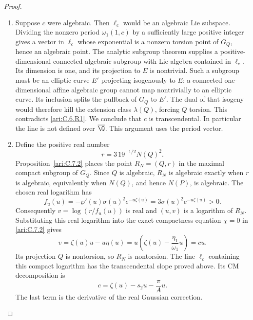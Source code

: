 \begin{proof}
\begin{enumerate}[label=\arabic*.,leftmargin=*]
\item Suppose $c$ were algebraic. Then $\ell_c$ would be an
algebraic Lie subspace. Dividing the nonzero period
$\omega_1(1,c)$ by a sufficiently large positive integer
gives a vector in $\ell_c$ whose exponential is a nonzero
torsion point of $G_Q$, hence an algebraic point. The
analytic subgroup theorem
\citep[Theorem~6.1, arXiv v8, p.~43]{huber2022} supplies a positive-dimensional
connected algebraic subgroup with Lie algebra contained in
$\ell_c$. Its dimension is one, and its projection to $E$
is nontrivial. Such a subgroup must be an elliptic curve
$E'$ projecting isogenously to $E$: a connected
one-dimensional affine algebraic group cannot map
nontrivially to an elliptic curve. Its inclusion splits the
pullback of $G_Q$ to $E'$. The dual of that isogeny would
therefore kill the extension class $\lambda(Q)$, forcing
$Q$ torsion. This contradicts \ref{ari:C.6.R1}. We conclude that $c$
is transcendental. In particular the line is not defined over
$\overline\Q$. This argument uses the period vector.

\item Define the positive real number
\[
 r=3\,19^{-1/2}N(Q)^2.
\]
Proposition~\ref{ari:C.7.2} places the point $R_N=(Q,r)$
in the maximal compact subgroup of $G_Q$. Since $Q$ is algebraic,
$R_N$ is algebraic exactly when $r$ is algebraic, equivalently
when $N(Q)$, and hence $N(P)$, is algebraic. The chosen real
logarithm has
\[
 f_u(u)=-\wp'(u)\sigma(u)^2e^{-u\zeta(u)}
        =3\sigma(u)^2e^{-u\zeta(u)}>0.
\]
Consequently $v=\log(r/f_u(u))$ is real and
$(u,v)$ is a logarithm of $R_N$. Substituting this real logarithm into the exact
compactness equation $\chi=0$ in \ref{ari:C.7.2} gives
\[
 v=\zeta(u)u-u\eta(u)
   =u\left(\zeta(u)-\frac{\eta_1}{\omega_1}u\right)=cu.
\]
Its projection $Q$ is nontorsion, so $R_N$ is nontorsion.
The line $\ell_c$ containing this compact logarithm has the
transcendental slope proved above. Its CM decomposition is
\[
 c=\zeta(u)-s_2u-\frac{\pi}{A}u.
\]
The last term is the derivative of the real Gaussian
correction.
\end{enumerate}
\end{proof}